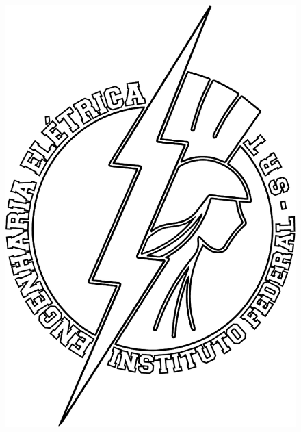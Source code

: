 \begin{minipage}{0.26\linewidth}
	\begin{figure}[H]
		\flushright
		\includegraphics[scale=0.07]{Figuras/logo-eng2}
	\end{figure}
\end{minipage}

\vspace{0.5cm}


